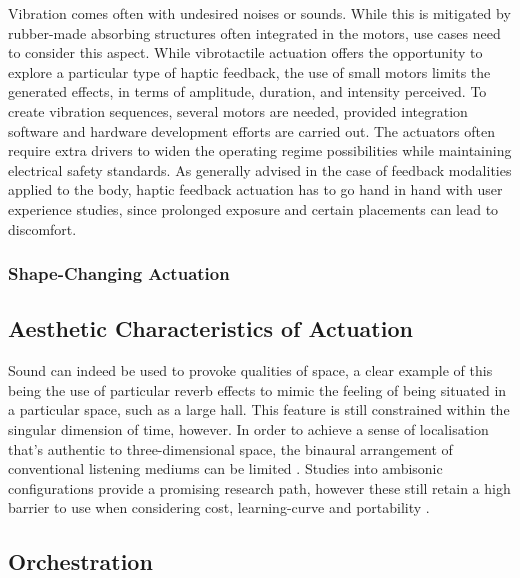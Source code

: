 Vibration comes often with undesired noises or sounds. While this is mitigated by rubber-made absorbing structures often integrated in the motors, use cases need to consider this aspect. While vibrotactile actuation offers the opportunity to explore a particular type of haptic feedback, the use of small motors limits the generated effects, in terms of amplitude, duration, and intensity perceived. To create vibration sequences, several motors are needed, provided integration software and hardware development efforts are carried out. The actuators often require extra drivers to widen the operating regime possibilities while maintaining electrical safety standards. As generally advised in the case of feedback modalities applied to the body, haptic feedback actuation has to go hand in hand with user experience studies, since prolonged exposure and certain placements can lead to discomfort.


\subsubsection{Shape-Changing Actuation}

\subsection{Aesthetic Characteristics of Actuation}

Sound can indeed be used to provoke qualities of space, a clear example of this being the use of particular reverb effects to mimic the feeling of being situated in a particular space, such as a large hall. This feature is still constrained within the singular dimension of time, however. In order to achieve a sense of localisation that's authentic to three-dimensional space, the binaural arrangement of conventional listening mediums can be limited \cite{chang_impairments_2018}. Studies into ambisonic configurations provide a promising research path, however these still retain a high barrier to use when considering cost, learning-curve and portability \cite{huisman_sound_2021}.

\subsection{Orchestration}

